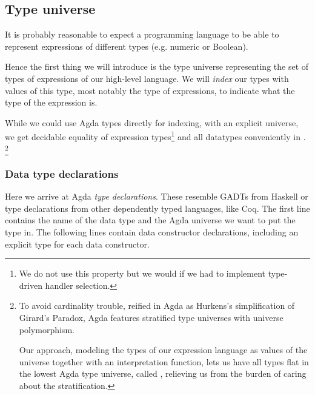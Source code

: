 

\subsection{Type universe}

It is probably reasonable to expect a programming language to be able to represent
expressions of different types (e.g. numeric or Boolean).

Hence the first thing we will introduce is the type universe representing the set of
types of expressions of our high-level language. We will \emph{index} our types with
values of this type, most notably the type  of expressions, to
indicate what the type of the expression is.

While we could use Agda
types directly for indexing, with an explicit universe, we get decidable
equality of expression types\footnote{We do not use this property but we would
if we had to implement type-driven handler selection.} and all datatypes conveniently
in .%
\footnote{To avoid cardinality trouble, reified in Agda as Hurkens's
simplification\cite{hurkens} of Girard's Paradox\cite{girard:dissertation},
Agda features stratified type universes with universe polymorphism.

Our approach, modeling the types of our expression language as values
of the universe  together with an interpretation function,
lets us have all types flat in the lowest Agda type
universe, called , relieving us from the burden of caring about the
stratification.}


\subsubsection{Data type declarations}

Here we arrive at Agda \emph{type declarations}. These resemble GADTs from
Haskell or type declarations from other dependently typed languages, like Coq.
The first line contains the name of the data type and the Agda universe we want to
put the type in. The following lines contain data constructor declarations,
including an explicit type for each data constructor.

